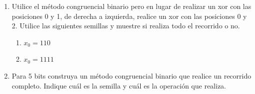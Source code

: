 \begin{enumerate}
    \renewcommand{\theenumi}{Ejercicio \arabic{enumi}} %
    \setcounter{enumi}{0} %
    \item Utilice el método congruencial binario pero en lugar de realizar un xor con las posiciones 0 y 1, de derecha a izquierda, realice un xor con las posiciones 0 y 2. Utilice las siguientes semillas y muestre si realiza todo el recorrido o no.
    \begin{enumerate}[label=\alph*.]
    \item $x_0 = 110$
    \item $x_0 = 1111$
    \end{enumerate}
    \item Para 5 bits construya un método congruencial binario que realice un recorrido completo. Indique cuál es la semilla y cuál es la operación que realiza.


\end{enumerate}
